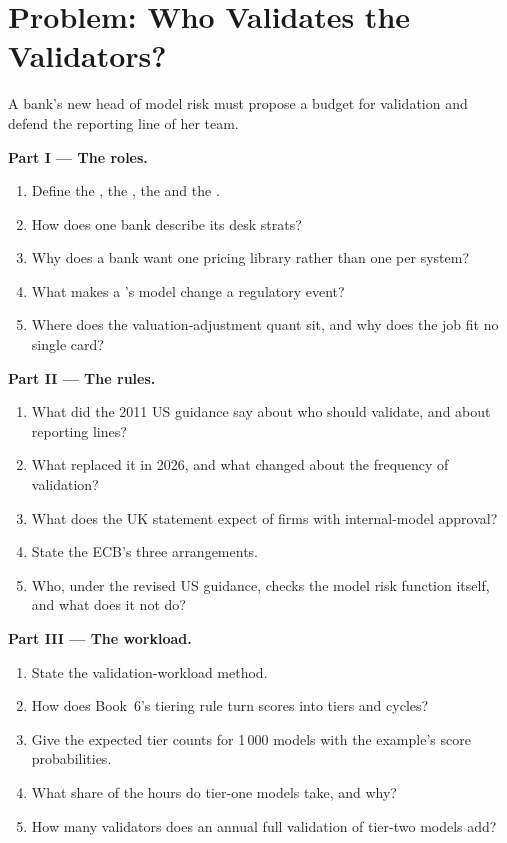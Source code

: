 \section{Problem: Who Validates the Validators?}

\begin{problem}\label{pb:in:bank-quant:1}
A bank's new head of model risk must propose a budget for validation and defend the reporting line of her team.

\medskip\noindent\textbf{Part I --- The roles.}
\begin{enumerate}
\item Define the , the , the  and the .
\item How does one bank describe its desk strats?
\item Why does a bank want one pricing library rather than one per system?
\item What makes a 's model change a regulatory event?
\item Where does the valuation-adjustment quant sit, and why does the job fit no single card?
\end{enumerate}

\medskip\noindent\textbf{Part II --- The rules.}
\begin{enumerate}[resume]
\item What did the 2011 US guidance say about who should validate, and about reporting lines?
\item What replaced it in 2026, and what changed about the frequency of validation?
\item What does the UK statement expect of firms with internal-model approval?
\item State the ECB's three arrangements.
\item Who, under the revised US guidance, checks the model risk function itself, and what does it not do?
\end{enumerate}

\medskip\noindent\textbf{Part III --- The workload.}
\begin{enumerate}[resume]
\item State the validation-workload method.
\item How does Book~6's tiering rule turn scores into tiers and cycles?
\item Give the expected tier counts for 1\,000 models with the example's score probabilities.
\item What share of the hours do tier-one models take, and why?
\item How many validators does an annual full validation of tier-two models add?
\end{enumerate}


\end{problem}
